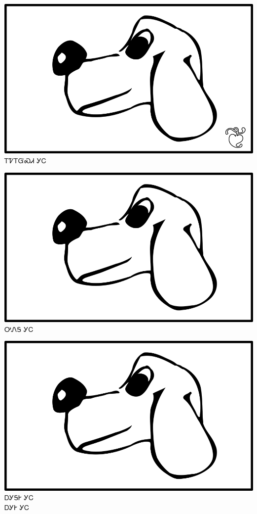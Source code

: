\documentclass[avery5371]{flashcards}%
\begin{document}

\begin{flashcard}{
\includegraphics[width=0.95\columnwidth,height=.51\columnwidth,keepaspectratio]{../artwork/for-colors/gihli-with-leaf}
}\Huge ᎢᏤᎢᏳᏍᏗ ᎩᏟ
\end{flashcard}

\begin{flashcard}{
\includegraphics[width=0.95\columnwidth,height=.51\columnwidth,keepaspectratio]{../artwork/for-colors/gihli}
}\Huge ᎤᏁᎦ ᎩᏟ
\end{flashcard}

\begin{flashcard}{
\includegraphics[width=0.95\columnwidth,height=.51\columnwidth,keepaspectratio]{../artwork/for-colors/gihli}
}\Huge ᎠᎩᎦᎨ ᎩᏟ\\ᎠᎩᎨ ᎩᏟ
\end{flashcard}
\end{document}
